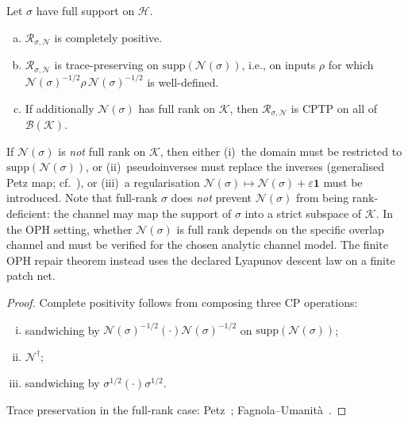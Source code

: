 \begin{proposition}
\label{prop:petz-cptp}
Let $\sigma$ have full support on $\mathcal{H}$.
\begin{enumerate}[(a)]
  \item $\mathcal{R}_{\sigma,\mathcal{N}}$ is completely positive.
  \item $\mathcal{R}_{\sigma,\mathcal{N}}$ is trace-preserving on
        $\mathrm{supp}(\mathcal{N}(\sigma))$, i.e., on inputs $\rho$
        for which $\mathcal{N}(\sigma)^{-1/2}\rho\,\mathcal{N}(\sigma)^{-1/2}$
        is well-defined.
  \item If additionally $\mathcal{N}(\sigma)$ has full rank on $\mathcal{K}$,
        then $\mathcal{R}_{\sigma,\mathcal{N}}$ is \textrm{CPTP} on all
        of $\mathcal{B}(\mathcal{K})$.
\end{enumerate}
If $\mathcal{N}(\sigma)$ is \emph{not} full rank on $\mathcal{K}$,
then either (i)~the domain must be restricted to
$\mathrm{supp}(\mathcal{N}(\sigma))$, or
(ii)~pseudoinverses must replace the inverses (generalised Petz map;
cf.~\cite{Junge2018}), or
(iii)~a regularisation
$\mathcal{N}(\sigma)\mapsto\mathcal{N}(\sigma)+\varepsilon\mathbf{1}$
must be introduced.
Note that full-rank $\sigma$ does \emph{not} prevent $\mathcal{N}(\sigma)$
from being rank-deficient: the channel may map the support of $\sigma$
into a strict subspace of $\mathcal{K}$.
In the \textrm{OPH} setting, whether $\mathcal{N}(\sigma)$ is full rank
depends on the specific overlap channel and must be verified for the chosen analytic channel
model. The finite OPH repair theorem instead uses the declared Lyapunov descent law on a finite
patch net.
\end{proposition}

\begin{proof}
Complete positivity follows from composing three \textrm{CP} operations:
\begin{enumerate}[(i)]
  \item sandwiching by
        $\mathcal{N}(\sigma)^{-1/2}(\cdot)\mathcal{N}(\sigma)^{-1/2}$
        on $\mathrm{supp}(\mathcal{N}(\sigma))$;
  \item $\mathcal{N}^\dagger$;
  \item sandwiching by $\sigma^{1/2}(\cdot)\sigma^{1/2}$.
\end{enumerate}
Trace preservation in the full-rank case:
Petz~\cite{Petz1986}; Fagnola--Umanit\`{a}~\cite{FagnolaUmanita2010}.
\end{proof}

